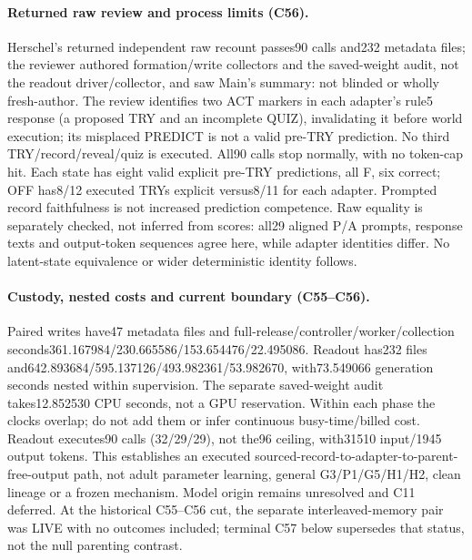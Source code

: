 \documentclass{article}
\begin{document}
\paragraph{Returned raw review and process limits (C56).} Herschel's returned independent raw recount passes90 calls and232 metadata files; the reviewer authored formation/write collectors and the saved-weight audit, not the readout driver/collector, and saw Main's summary: not blinded or wholly fresh-author. The review identifies two ACT markers in each adapter's rule5 response (a proposed TRY and an incomplete QUIZ), invalidating it before world execution; its misplaced PREDICT is not a valid pre-TRY prediction. No third TRY/record/reveal/quiz is executed. All90 calls stop normally, with no token-cap hit. Each state has eight valid explicit pre-TRY predictions, all F, six correct; OFF has8/12 executed TRYs explicit versus8/11 for each adapter. Prompted record faithfulness is not increased prediction competence. Raw equality is separately checked, not inferred from scores: all29 aligned P/A prompts, response texts and output-token sequences agree here, while adapter identities differ. No latent-state equivalence or wider deterministic identity follows.

\paragraph{Custody, nested costs and current boundary (C55--C56).} Paired writes have47 metadata files and full-release/controller/worker/collection seconds361.167984/230.665586/153.654476/22.495086. Readout has232 files and642.893684/595.137126/493.982361/53.982670, with73.549066 generation seconds nested within supervision. The separate saved-weight audit takes12.852530 CPU seconds, not a GPU reservation. Within each phase the clocks overlap; do not add them or infer continuous busy-time/billed cost. Readout executes90 calls (32/29/29), not the96 ceiling, with31510 input/1945 output tokens. This establishes an executed sourced-record-to-adapter-to-parent-free-output path, not adult parameter learning, general G3/P1/G5/H1/H2, clean lineage or a frozen mechanism. Model origin remains unresolved and C11 deferred. At the historical C55--C56 cut, the separate interleaved-memory pair was LIVE with no outcomes included; terminal C57 below supersedes that status, not the null parenting contrast.
\end{document}
